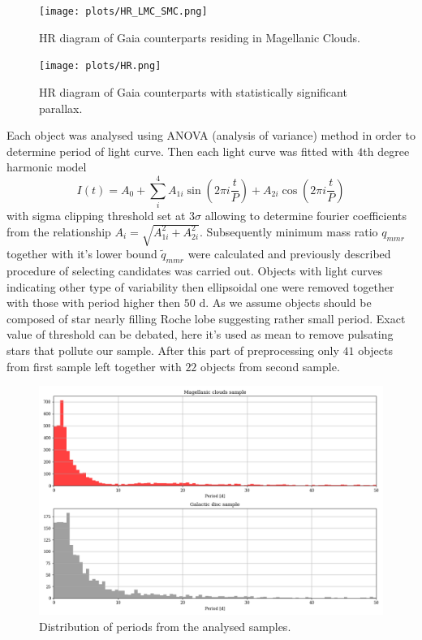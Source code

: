 \documentclass{pracalicmgr}
\begin{document}
\begin{figure}[H]
    \begin{center}
        \texttt{[image: plots/HR\_LMC\_SMC.png]}
    \end{center}
    \caption{HR diagram of Gaia counterparts residing in Magellanic Clouds.}
\end{figure}

\begin{figure}[H]
    \begin{center}
        \texttt{[image: plots/HR.png]}
    \end{center}
    \caption{HR diagram of Gaia counterparts with statistically significant parallax.}
\end{figure}

Each object was analysed using ANOVA (analysis of variance) method \citep{schwarzenberg-czerny_advantage_1989} in order to determine period of light curve.
Then each light curve was fitted with $4$th degree harmonic model
\begin{equation}\label{harm}
    I(t)=A_0+\sum_i^4 A_{1i}\sin{\left(2\pi i\frac{t}{P}\right)}+A_{2i}\cos{\left(2\pi i\frac{t}{P}\right)}
\end{equation}
with sigma clipping threshold set at $3\sigma$ allowing to determine fourier coefficients from the relationship $A_i=\sqrt{A_{1i}^2+A_{2i}^2}$.
 Subsequently minimum mass ratio $q_{mmr}$ together with it's lower bound $\tilde{q}_{mmr}$ were calculated and previously described procedure of selecting candidates was carried out.
Objects with light curves indicating other type of variability then ellipsoidal one were removed together with those with period higher then
$50$ d. As we assume objects should be composed of star nearly filling Roche lobe suggesting rather small period. Exact value of threshold can be debated, here it's used as mean to 
remove pulsating stars that pollute our sample. After this part of preprocessing only $41$ objects from first sample left together with $22$ objects from second sample.
\begin{figure}
    \includegraphics[scale=0.5]{plots/periods.png}
    \caption{Distribution of periods from the analysed samples.}
\end{figure}
\end{document}
